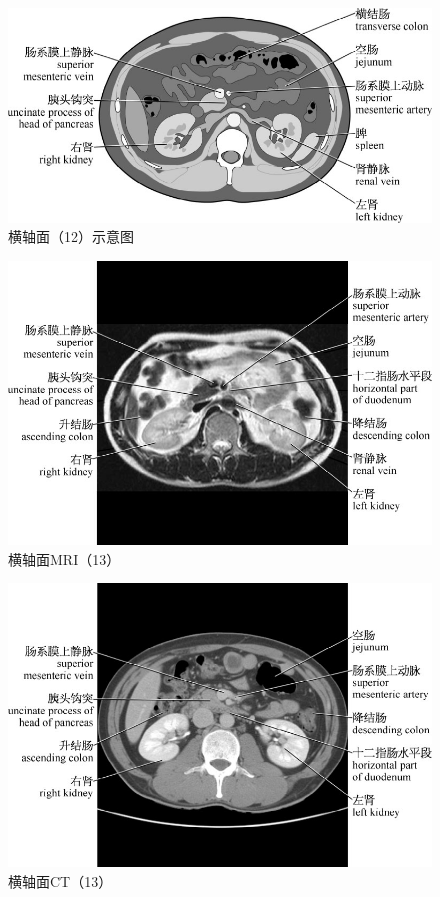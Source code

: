 \begin{figure}[!htbp]
 \centering
 \includegraphics{./images/Image00037.jpg}
 \captionsetup{justification=centering}
 \caption{横轴面（12）示意图}
  \end{figure} 
 \FloatBarrier

\begin{figure}[!htbp]
 \centering
 \includegraphics{./images/Image00038.jpg}
 \captionsetup{justification=centering}
 \caption{横轴面MRI（13）}
  \end{figure} 
 \FloatBarrier

\begin{figure}[!htbp]
 \centering
 \includegraphics{./images/Image00039.jpg}
 \captionsetup{justification=centering}
 \caption{横轴面CT（13）}
  \end{figure} 
 \FloatBarrier

